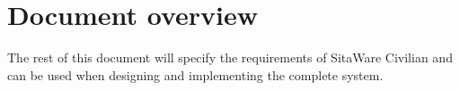 \section{Document overview}

The rest of this document will specify the requirements of SitaWare Civilian and can be used when designing and implementing the complete system.